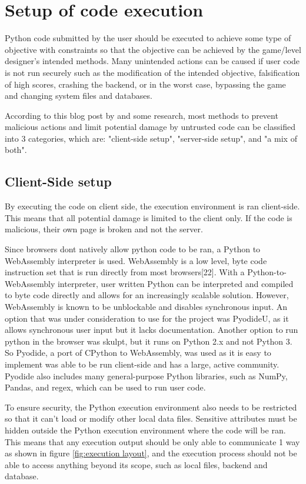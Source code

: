 \section{Setup of code execution}
Python code submitted by the user should be executed to achieve some type of objective with constraints so that the objective can be achieved by the game/level designer's intended methods. Many unintended actions can be caused if user code is not run securely such as the modification of the intended objective, falsification of high scores, crashing the backend, or in the worst case, bypassing the game and changing system files and databases.

According to this blog post by \cite{codecombat_aether} and some research, most methods to prevent malicious actions and limit potential damage by untrusted code can be classified into 3 categories, which are: "client-side setup", "server-side setup", and "a mix of both".

\subsection{Client-Side setup}
By executing the code on client side, the execution environment is ran client-side. This means that all potential damage is limited to the client only. If the code is malicious, their own page is broken and not the server.

Since browsers dont natively allow python code to be ran, a Python to WebAssembly interpreter is used. WebAssembly is a low level, byte code instruction set that is run directly from most browsers[22]. With a Python-to-WebAssembly interpreter, user written Python can be interpreted and compiled to byte code directly and allows for an increasingly scalable solution. However, WebAssembly is known to be unblockable and disables synchronous input. An option that was under consideration to use for the project was PyodideU, as it allows synchronous user input but it lacks documentation. Another option to run python in the browser was skulpt, but it runs on Python 2.x and not Python 3. So Pyodide, a port of CPython to WebAssembly, was used as it is easy to implement was able to be run client-side and has a large, active community. Pyodide also includes many general-purpose Python libraries, such as NumPy, Pandas, and regex, which can be used to run user code.

To ensure security, the Python execution environment also needs to be restricted so that it can't load or modify other local data files. Sensitive attributes must be hidden outside the Python execution environment where the code will be ran. This means that any execution output should be only able to communicate 1 way as shown in figure \ref{fig:execution layout}, and the execution process should not be able to access anything beyond its scope, such as local files, backend and database.

